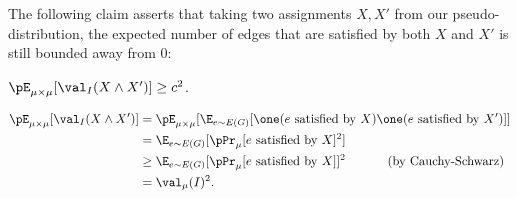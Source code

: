 The following claim asserts that taking two assignments $X, X'$ from our pseudo-distribution, 
the expected number of edges that are satisfied by 
both $X$ and $X'$ is still bounded away from $0$:
\begin{claim}\label{claim:val-intersection-restated}
$\pE_{\mu \times \mu}[\val_I(X \wedge X')] \geq c^2$.
\end{claim}
\begin{align*}
\pE_{\mu \times \mu}[\val_I(X \wedge X')] &= \pE_{\mu \times \mu}[\E_{e \sim E(G)}[\one(e \text{ satisfied by } X)\one(e \text{ satisfied by } X')]] \\
&= \E_{e \sim E(G)}[\pPr_\mu[e \text{ satisfied by } X]^2] \\
&\geq \E_{e \sim E(G)}[\pPr_\mu[e \text{ satisfied by } X]]^2 ~~~~~~~~~~\text{(by Cauchy-Schwarz)}\\
&= \val_\mu(I)^2.
\end{align*}





